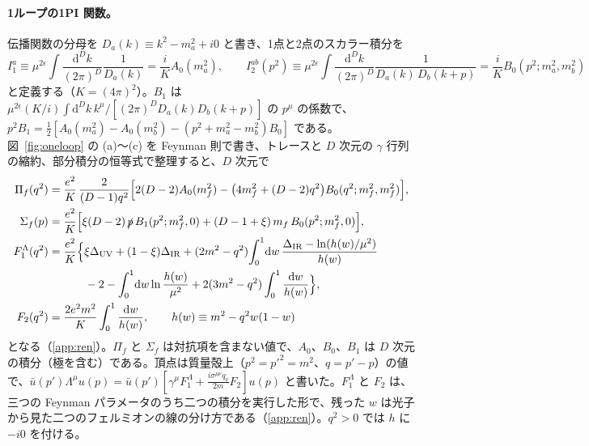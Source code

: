 \documentclass[a4paper,10pt]{ltjsarticle}
\newcommand{\dd}{\mathrm{d}}
\newcommand{\DUV}{\Delta_{\mathrm{UV}}}
\newcommand{\DIR}{\Delta_{\mathrm{IR}}}
\begin{document}
\paragraph{1ループの1PI 関数。}伝播関数の分母を $D_a(k)\equiv k^2-m_a^2+i0$ と書き、1点と2点のスカラー積分を
\begin{equation}
I_1^a\equiv\mu^{2\epsilon}\int\frac{\dd^Dk}{(2\pi)^D}\frac{1}{D_a(k)}=\frac iKA_0(m_a^2),\qquad
I_2^{ab}(p^2)\equiv\mu^{2\epsilon}\int\frac{\dd^Dk}{(2\pi)^D}\frac{1}{D_a(k)\,D_b(k+p)}=\frac iKB_0(p^2;m_a^2,m_b^2)
\label{eq:IN}
\end{equation}
と定義する（$K=(4\pi)^2$）。$B_1$ は $\mu^{2\epsilon}(K/i)\int\dd^Dk\,k^\mu/[(2\pi)^DD_a(k)D_b(k+p)]$ の $p^\mu$ の係数で、$p^2B_1=\frac12[A_0(m_a^2)-A_0(m_b^2)-(p^2+m_a^2-m_b^2)B_0]$ である。図~\ref{fig:oneloop} の (a)〜(c) を Feynman 則で書き、トレースと $D$ 次元の $\gamma$ 行列の縮約、部分積分の恒等式で整理すると、$D$ 次元で
\begin{equation}
\begin{aligned}
\Pi_f(q^2)&=\frac{e^2}{K}\,\frac{2}{(D-1)q^2}\Bigl[2(D-2)A_0(m_f^2)-\bigl(4m_f^2+(D-2)q^2\bigr)B_0(q^2;m_f^2,m_f^2)\Bigr],\\
\Sigma_f(p)&=\frac{e^2}{K}\Bigl[\xi(D-2)\,\slashed p\,B_1(p^2;m_f^2,0)+(D-1+\xi)\,m_f\,B_0(p^2;m_f^2,0)\Bigr],\\
F_1^\Lambda(q^2)&=\frac{e^2}{K}\Bigl\{\xi\DUV+(1-\xi)\DIR+(2m^2-q^2)\!\int_0^1\!\dd w\,\frac{\DIR-\ln(h(w)/\mu^2)}{h(w)}\\
&\hspace{3.2em}-2-\int_0^1\!\dd w\ln\frac{h(w)}{\mu^2}+2(3m^2-q^2)\int_0^1\frac{\dd w}{h(w)}\Bigr\},\\
F_2(q^2)&=\frac{2e^2m^2}{K}\int_0^1\frac{\dd w}{h(w)},\qquad h(w)\equiv m^2-q^2w(1-w)
\end{aligned}
\label{eq:V}
\end{equation}
となる（\ref{app:ren}）。$\Pi_f$ と $\Sigma_f$ は対抗項を含まない値で、$A_0$、$B_0$、$B_1$ は $D$ 次元の積分（極を含む）である。頂点は質量殻上（$p^2=p'^2=m^2$、$q=p'-p$）の値で、$\bar u(p')\Lambda^\mu u(p)=\bar u(p')[\gamma^\mu F_1^\Lambda+\frac{i\sigma^{\mu\nu}q_\nu}{2m}F_2]u(p)$ と書いた。$F_1^\Lambda$ と $F_2$ は、三つの Feynman パラメータのうち二つの積分を実行した形で、残った $w$ は光子から見た二つのフェルミオンの線の分け方である（\ref{app:ren}）。$q^2>0$ では $h$ に $-i0$ を付ける。
\end{document}
